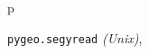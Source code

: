\documentclass[letterpaper,10pt,english]{sphinxmanual}
\begin{document}
\renewcommand{\indexname}{Python Module Index}
\begin{theindex}
\def\bigletter#1{{\Large\sffamily#1}\nopagebreak\vspace{1mm}}
\bigletter{p}
\item {\texttt{pygeo.segyread}} \emph{(Unix)}, \pageref{segyread:module-pygeo.segyread}
\end{theindex}

\renewcommand{\indexname}{Index}
\printindex
\end{document}
